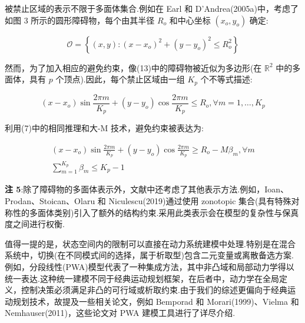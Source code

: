 \documentclass[10pt]{article}
\begin{document}
被禁止区域的表示不限于多面体集合.例如在 Earl 和 D'Andrea(2005a)中，考虑了如图 3 所示的圆形障碍物，每个由其半径 \({R}_{o}\) 和中心坐标 \(\left( {{x}_{o},{y}_{o}}\right)\) 确定:

\begin{equation}
\mathcal{O} = \left\{  {\left( {x,y}\right)  : {\left( x - {x}_{o}\right) }^{2} + {\left( y - {y}_{o}\right) }^{2} \leq  {R}_{o}^{2}}\right\}
\end{equation}

然而，为了加入相应的避免约束，像(13)中的障碍物被近似为多边形(在 \({\mathbb{R}}^{2}\) 中的多面体，具有 \(p\) 个顶点).因此，每个禁止区域由一组 \({K}_{p}\) 个不等式描述:


\begin{equation}
\left( {x - {x}_{o}}\right) \sin \frac{2\pi m}{{K}_{p}} + \left( {y - {y}_{o}}\right) \cos \frac{2\pi m}{{K}_{p}} \leq  {R}_{o},\forall m = 1,\ldots ,{K}_{p}
\end{equation}

利用(7)中的相同推理和大-M 技术，避免约束被表达为:

\begin{subequations}
\begin{gather}
\left( {x - {x}_{o}}\right) \sin \frac{2\pi m}{{K}_{p}} + \left( {y - {y}_{o}}\right) \cos \frac{2\pi m}{{K}_{p}} \geq  {R}_{o} - M{\beta }_{m},\forall m \\
\mathop{\sum }\limits_{{m = 1}}^{{K}_{p}}{\beta }_{m} \leq  {K}_{p} - 1
\end{gather}
\end{subequations}

\vspace{1 em}
\noindent\textbf{注 5}:除了障碍物的多面体表示外，文献中还考虑了其他表示方法.例如，Ioan、Prodan、Stoican、Olaru 和 Niculescu(2019)通过使用 zonotopic 集合(具有特殊对称性的多面体类别)引入了额外的结构约束.采用此类表示会在模型的复杂性与保真度之间进行权衡.
\vspace{1 em}

值得一提的是，状态空间内的限制可以直接在动力系统建模中处理.特别是在混合系统中，切换(在不同模式间的选择，属于析取型)包含二元变量或离散备选方案.例如，分段线性(PWA)模型代表了一种集成方法，其中非凸域和局部动力学得以统一表达.这种统一建模不同于经典运动规划框架，在后者中，动力学在全局定义，控制决策必须满足非凸的可行域或析取约束.由于我们的综述更偏向于经典运动规划技术，故提及一些相关论文，例如 Bemporad 和 Morari(1999)、Vielma 和 Nemhauser(2011)，这些论文对 PWA 建模工具进行了详尽介绍.\par
\end{document}
